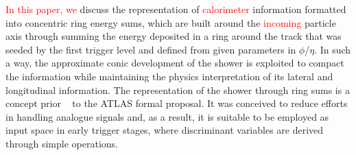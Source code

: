 \textcolor{red}{In this paper, we} discuss the representation of \textcolor{red}{calorimeter} information formatted into concentric ring energy sums, which are built around the \textcolor{red}{incoming} particle axis through summing the energy deposited in a ring around the track that was seeded by the first trigger level and defined from given parameters in $\phi$/$\eta$. In such a way, the approximate conic development of the shower is exploited to compact the information while maintaining the physics interpretation of its lateral and longitudinal information. The representation of the shower through ring sums is a concept prior ~\cite{1992_spacal_rings} to the ATLAS formal proposal. It was conceived to reduce efforts in handling analogue signals and, as a result, it is suitable to be employed as input space in early trigger stages, where discriminant variables are derived through simple operations.





